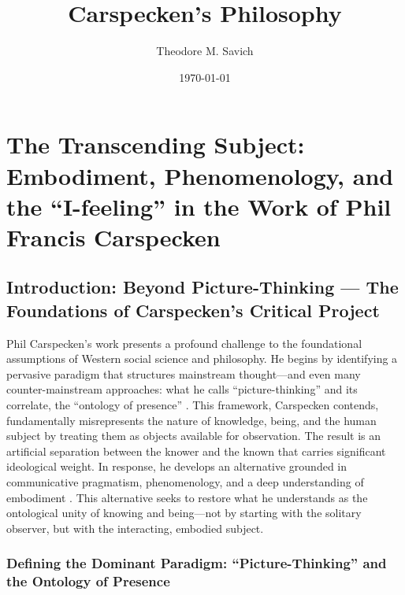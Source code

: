 \documentclass[12pt]{book}
\title{Carspecken's Philosophy}
\author{Theodore M. Savich}
\date{\today}
\begin{document}
\maketitle

\section{The Transcending Subject: Embodiment, Phenomenology, and the ``I-feeling'' in the Work of Phil Francis Carspecken}\label{the-transcending-subject-embodiment-phenomenology-and-the-i-feeling-in-the-work-of-phil-francis-carspecken}

\subsection{Introduction: Beyond Picture-Thinking --- The Foundations of Carspecken's Critical Project}\label{introduction-beyond-picture-thinking-the-foundations-of-carspeckens-critical-project}

Phil Carspecken's work presents a profound challenge to the foundational assumptions of Western social science and philosophy. He begins by identifying a pervasive paradigm that structures mainstream thought—and even many counter-mainstream approaches: what he calls ``picture-thinking'' and its correlate, the ``ontology of presence'' \parencite{carspecken_limits_2016, Carspecken2018}. This framework, Carspecken contends, fundamentally misrepresents the nature of knowledge, being, and the human subject by treating them as objects available for observation. The result is an artificial separation between the knower and the known that carries significant ideological weight. In response, he develops an alternative grounded in communicative pragmatism, phenomenology, and a deep understanding of embodiment \parencite{Carspecken1995aa, Carspecken2018}. This alternative seeks to restore what he understands as the ontological unity of knowing and being—not by starting with the solitary observer, but with the interacting, embodied subject.

\subsubsection{Defining the Dominant Paradigm: ``Picture-Thinking'' and the Ontology of Presence}\label{defining-the-dominant-paradigm-picture-thinking-and-the-ontology-of-presence}
\end{document}
